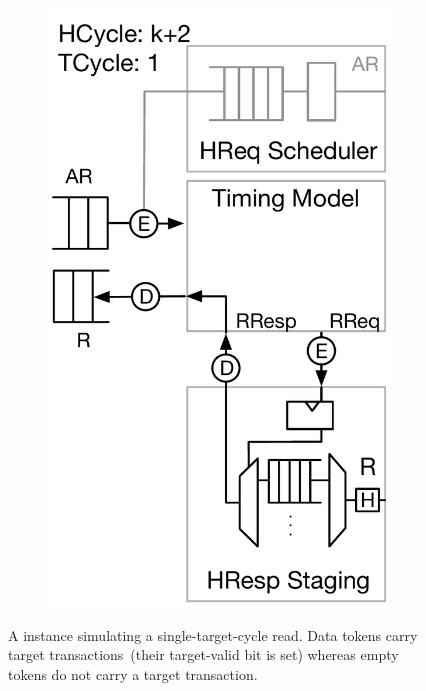 \begin{figure}[t]
\begin{subfigure}[t]{0.23\textwidth}
        \includegraphics[width=\columnwidth]{figures/model-operation-4.pdf}
        \caption{}
        \label{fig:model-operation-4}
    \end{subfigure}
	\centering
    \vspace{-0.15in}
    \caption{A \PNAME instance simulating a single-target-cycle read. Data
    tokens carry target transactions~(their target-valid bit is set) whereas
    empty tokens do not carry a target transaction.}
    \label{fig:model-operation}
\vspace{-0.20in}
\end{figure}

